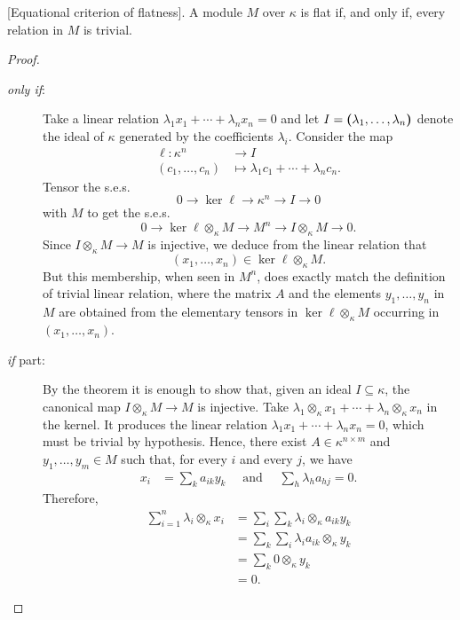 \begin{cor}\label{prop:relation-flatness} {\rm[Equational criterion of flatness]}.
    A module\/ $M$ over\/ $\kappa$ is flat if, and only if, every relation in\/ $M$ is trivial.
\end{cor}

\begin{proof}${}$
    \begin{description} 
        \item[\rm\textit{only if\/}:] Take a linear relation $\lambda_1x_1+\cdots+\lambda_nx_n=0$ and let $I=\textrm{\boldmath$($}\lambda_1,\dots,\lambda_n\textrm{\boldmath$)$}$ denote the ideal of $\kappa$ generated by the coefficients $\lambda_i$. Consider the map
        \begin{align*}
            \ell\colon\kappa^n&\to I\\
            (c_1,\dots,c_n)&\mapsto \lambda_1c_1+\cdots+\lambda_nc_n.
        \end{align*}
        Tensor the s.e.s.
        $$
            0\to\ker\ell\to\kappa^n\to I\to0
        $$
        with $M$ to get the s.e.s.
        $$
            0\to\ker\ell\otimes_\kappa M\to M^n\to I\otimes_\kappa M\to0.
        $$
        Since $I\otimes_\kappa M\to M$ is injective, we deduce from the linear relation that
        $$
            (x_1,\dots,x_n)\in\ker\ell\otimes_\kappa M.
        $$
        But this membership, when seen in $M^n$, does exactly match the definition of trivial linear relation, where the matrix $A$ and the elements $y_1,\dots, y_n$ in $M$ are obtained from the elementary tensors in $\ker\ell\otimes_\kappa M$ occurring in $(x_1,\dots,x_n)$.
    
        \item[\rm\textit{if\/} part:] By the theorem it is enough to show that, given an ideal $I\subseteq\kappa$, the canonical map $I\otimes_\kappa M\to M$ is injective. Take $\lambda_1\otimes_\kappa x_1+\cdots+\lambda_n\otimes_\kappa x_n$ in the kernel. It produces the linear relation $\lambda_1x_1+\cdots+\lambda_nx_n=0$, which must be trivial by hypothesis. Hence, there exist $A\in\kappa^{n\times m}$ and $y_1,\dots, y_m\in M$ such that, for every $i$ and every $j$, we have
        \begin{align*}
            x_i &= \sum_ka_{ik}y_k
                \quad\text{ and }\quad \sum_h\lambda_ha_{hj}=0.
        \end{align*}
        Therefore,
        \begin{align*}
            \sum_{i=1}^n\lambda_i\otimes_\kappa x_i
                &= \sum_i\sum_k\lambda_i\otimes_\kappa a_{ik}y_k\\
                &= \sum_k\sum_i\lambda_ia_{ik}\otimes_\kappa y_k\\
                &= \sum_k0\otimes_\kappa y_k\\
                &= 0.
        \end{align*}
    \end{description}
\end{proof}


